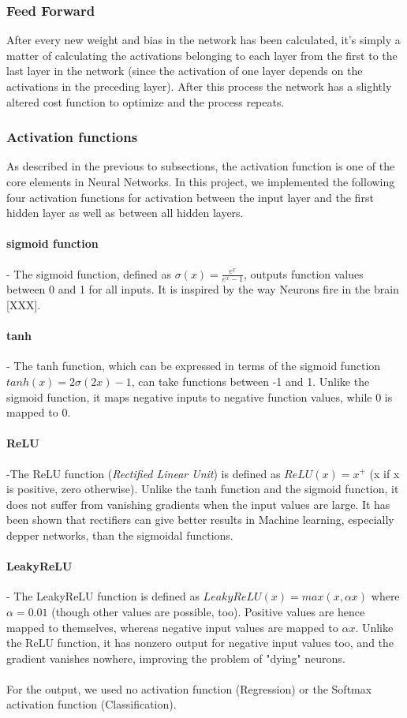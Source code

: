 \documentclass[11pt,a4paper,titlepage]{article}
\begin{document}
\subsubsection{Feed Forward}
After every new weight and bias in the network has been calculated, it's simply a matter of calculating the activations belonging to each layer from the first to the last layer in the network (since the activation of one layer depends on the activations in the preceding layer). After this process the network has a slightly altered cost function to optimize and the process repeats. 
\subsubsection{Activation functions}
As described in the previous to subsections, the activation function is one of the core elements in Neural Networks. In this project, we implemented the following four activation functions for activation between the input layer and the first hidden layer as well as between all hidden layers. 
\paragraph*{sigmoid function} - The sigmoid function, defined as $\sigma(x)=\frac{e^x}{e^x-1}$, outputs function values between 0 and 1 for all inputs. It is inspired by the way Neurons fire in the brain [XXX].
\paragraph*{tanh} - The tanh function, which can be expressed in terms of the sigmoid function $tanh(x)=2\sigma(2x)-1$, can take functions between -1 and 1. Unlike the sigmoid function, it maps negative inputs to negative function values, while 0 is mapped to 0.
\paragraph*{ReLU} -The ReLU function (\textit{Rectified Linear Unit}) is defined as $ReLU(x)=x^+$ (x if x is positive, zero otherwise). Unlike the tanh function and the sigmoid function, it does not suffer from vanishing gradients when the input values are large. It has been shown \citep{surpremeRELU} that rectifiers can give better results in Machine learning, especially depper networks, than the sigmoidal functions.
\paragraph*{LeakyReLU} - The LeakyReLU function is defined as $LeakyReLU(x)=max(x,\alpha x)$ where $\alpha=0.01$ (though other values are possible, too). Positive values are hence mapped to themselves, whereas negative input values are mapped to $\alpha x$. Unlike the ReLU function, it has nonzero output for negative input values too, and the gradient vanishes nowhere, improving the problem of "dying" neurons.\\\\
For the output, we used no activation function (Regression) or the Softmax activation function (Classification). 
\end{document}
